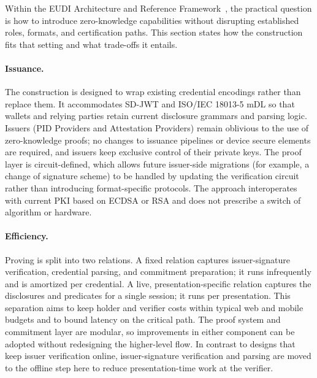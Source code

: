 
Within the EUDI Architecture and Reference Framework~\cite{EU:EUDI23}, the practical question is how to introduce zero-knowledge capabilities without disrupting established roles, formats, and certification paths. This section states how the construction fits that setting and what trade-offs it entails.

\paragraph{Issuance.}
The construction is designed to wrap existing credential encodings rather than replace them. It accommodates SD-JWT and ISO/IEC 18013-5 mDL so that wallets and relying parties retain current disclosure grammars and parsing logic. Issuers (PID Providers and Attestation Providers) remain oblivious to the use of zero-knowledge proofs; no changes to issuance pipelines or device secure elements are required, and issuers keep exclusive control of their private keys. The proof layer is circuit-defined, which allows future issuer-side migrations (for example, a change of signature scheme) to be handled by updating the verification circuit rather than introducing format-specific protocols. The approach interoperates with current PKI based on ECDSA or RSA and does not prescribe a switch of algorithm or hardware.

\paragraph{Efficiency.}
Proving is split into two relations. A fixed relation captures issuer-signature verification, credential parsing, and commitment preparation; it runs infrequently and is amortized per credential. A live, presentation-specific relation captures the disclosures and predicates for a single session; it runs per presentation. This separation aims to keep holder and verifier costs within typical web and mobile budgets and to bound latency on the critical path. The proof system and commitment layer are modular, so improvements in either component can be adopted without redesigning the higher-level flow. In contrast to designs that keep issuer verification online, issuer-signature verification and parsing are moved to the offline step here to reduce presentation-time work at the verifier.

